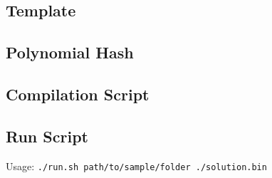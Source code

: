 \documentclass{article}
\begin{document}
\subsection*{Template}


\subsection*{Polynomial Hash}


\subsection*{Compilation Script}


\subsection*{Run Script}
Usage: \lstinline{./run.sh path/to/sample/folder ./solution.bin}

\end{document}
